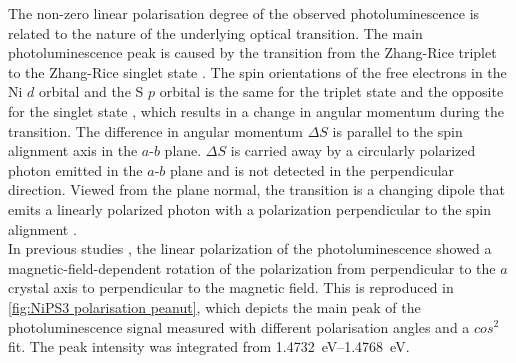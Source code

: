 \documentclass[
	twoside,
	parskip=half,
	a4paper,
]{scrbook}
\begin{document}
The non-zero linear polarisation degree of the observed photoluminescence is related to the nature of the underlying optical transition.
The main photoluminescence peak is caused by the transition from the Zhang-Rice triplet to the Zhang-Rice singlet state \cite{NiPS3_coherent}.
The spin orientations of the free electrons in the Ni $d$ orbital and the S $p$ orbital is the same for the triplet state and the opposite for the singlet state \cite{NiPS3_coherent}, which results in a change in angular momentum during the transition.
The difference in angular momentum $\Delta S$ is parallel to the spin alignment axis in the $a$-$b$ plane.
$\Delta S$ is carried away by a circularly polarized photon emitted in the $a$-$b$ plane and is not detected \cite{NiPS3_linear} in the perpendicular direction.
Viewed from the plane normal, the transition is a changing dipole that emits a linearly polarized photon with a polarization perpendicular to the spin alignment \cite{NiPS3_linear}.\\
In previous studies \cite{NiPS3_linear}, the linear polarization of the photoluminescence showed a magnetic-field-dependent rotation of the polarization from perpendicular to the $a$ crystal axis to perpendicular to the magnetic field.
This is reproduced in \autoref{fig:NiPS3 polarisation peanut}, which depicts the main peak of the photoluminescence signal measured with different polarisation angles and a $cos^2$ fit. The peak intensity was integrated from \SIrange{1.4732}{1.4768}{eV}. 
\end{document}
